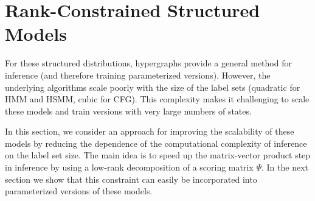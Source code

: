 \documentclass{article}
\begin{document}


\section{Rank-Constrained Structured Models}
\label{sec:linearizing}

For these structured distributions, hypergraphs provide a general method for inference (and therefore training parameterized versions). However, the underlying algorithms scale poorly with the size of the label sets (quadratic for HMM and HSMM, cubic for CFG). This complexity makes it challenging to scale these models and train versions with very large numbers of states.

In this section, we consider an approach for improving the scalability
of these models by reducing the dependence of the computational complexity of inference on the label set size.
The main idea is to speed up the matrix-vector product step in inference by using a low-rank decomposition of 
a scoring matrix $\Psi$.
In the next section we show that this constraint can easily be incorporated into parameterized versions of these models.
\end{document}
